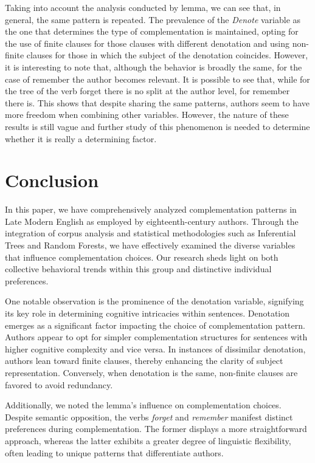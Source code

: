 \documentclass[final]{clv3} %
\begin{document}
Taking into account the analysis conducted by lemma, we can see that, in general, the same pattern is repeated. The prevalence of the \textit{Denote} variable as the one that determines the type of complementation is maintained, opting for the use of finite clauses for those clauses with different denotation and using non-finite clauses for those in which the subject of the denotation coincides. However, it is interesting to note that, although the behavior is broadly the same, for the case of remember the author becomes relevant. It is possible to see that, while for the tree of the verb forget there is no split at the author level, for remember there is. This shows that despite sharing the same patterns, authors seem to have more freedom when combining other variables. However, the nature of these results is still vague and further study of this phenomenon is needed to determine whether it is really a determining factor. 

\section{Conclusion}

In this paper, we have comprehensively analyzed complementation patterns in Late Modern English as employed by eighteenth-century authors. Through the integration of corpus analysis and statistical methodologies such as Inferential Trees and Random Forests, we have effectively examined the diverse variables that influence complementation choices. Our research sheds light on both collective behavioral trends within this group and distinctive individual preferences.

One notable observation is the prominence of the denotation variable, signifying its key role in determining cognitive intricacies within sentences. Denotation emerges as a significant factor impacting the choice of complementation pattern. Authors appear to opt for simpler complementation structures for sentences with higher cognitive complexity and vice versa. In instances of dissimilar denotation, authors lean toward finite clauses, thereby enhancing the clarity of subject representation. Conversely, when denotation is the same, non-finite clauses are favored to avoid redundancy.

Additionally, we noted the lemma's influence on complementation choices. Despite semantic opposition, the verbs \textit{forget} and \textit{remember} manifest distinct preferences during complementation. The former displays a more straightforward approach, whereas the latter exhibits a greater degree of linguistic flexibility, often leading to unique patterns that differentiate authors.
\end{document}
